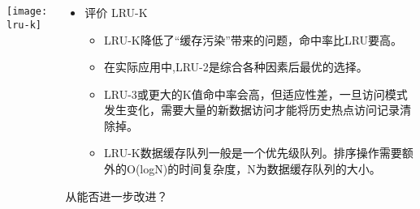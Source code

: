 \begin{frame}[plain]
	\frametitle{ }
	\begin{columns}
		\begin{column}{.4\textwidth}
			\centering
			\texttt{[image: lru-k]}
		\end{column}
		
		\begin{column}{.6\textwidth}
			
			\begin{itemize}
				\item 评价 LRU-K 
				\begin{itemize}
					
					\item LRU-K降低了“缓存污染”带来的问题，命中率比LRU要高。
					\item 在实际应用中,LRU-2是综合各种因素后最优的选择。
					\item LRU-3或更大的K值命中率会高，但适应性差，一旦访问模式发生变化，需要大量的新数据访问才能将历史热点访问记录清除掉。
					\item LRU-K数据缓存队列一般是一个优先级队列。排序操作需要额外的O(logN)的时间复杂度，N为数据缓存队列的大小。
					
				\end{itemize}
			\end{itemize}
			\centering
			\large 从能否进一步改进？
		\end{column}
		
		
	\end{columns}
\end{frame}




